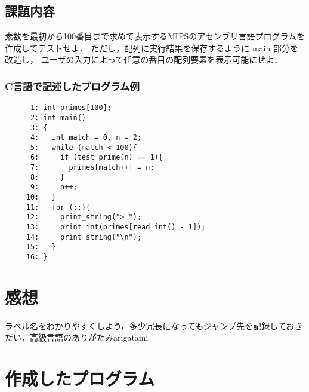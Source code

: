 \documentclass[a4j,11pt]{jarticle}
\begin{document}
\subsection{課題内容}

素数を最初から100番目まで求めて表示するMIPSのアセンブリ言語プログラムを作成してテストせよ． 
ただし，配列に実行結果を保存するように main 部分を改造し， 
ユーザの入力によって任意の番目の配列要素を表示可能にせよ．

\subsubsection{C言語で記述したプログラム例}

\begin{verbatim}
      1: int primes[100];
      2: int main()
      3: {
      4:   int match = 0, n = 2;
      5:   while (match < 100){
      6:     if (test_prime(n) == 1){
      7:       primes[match++] = n;
      8:     }
      9:     n++;
     10:   }
     11:   for (;;){
     12:     print_string("> ");
     13:     print_int(primes[read_int() - 1]);
     14:     print_string("\n");
     15:   }
     16: }
\end{verbatim}



\section{感想}
ラベル名をわかりやすくしよう，多少冗長になってもジャンプ先を記録しておきたい，高級言語のありがたみarigatami

\section{作成したプログラム}\label{sec:sourcecode}


{\fontsize{10pt}{11pt} \selectfont
\begin{verbatim}
\end{verbatim}
}
\end{document}
